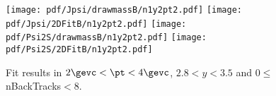 \begin{figure}[H]
\begin{center}
\texttt{[image: pdf/Jpsi/drawmassB/n1y2pt2.pdf]}
\texttt{[image: pdf/Jpsi/2DFitB/n1y2pt2.pdf]}
\vspace*{-0.5cm}
\texttt{[image: pdf/Psi2S/drawmassB/n1y2pt2.pdf]}
\texttt{[image: pdf/Psi2S/2DFitB/n1y2pt2.pdf]}
\vspace*{-0.5cm}
\end{center}
\caption{Fit results in $2\gevc<\pt<4\gevc$, $2.8<y<3.5$ and 0$\leq$nBackTracks$<$8.}
\label{Fitn1y2pt2}
\end{figure}
